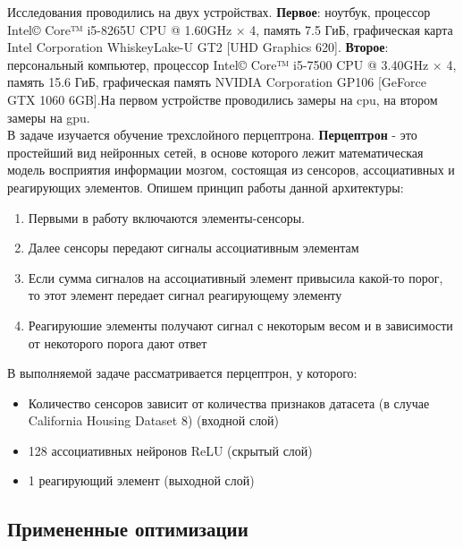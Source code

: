 \documentclass[a4paper,12pt,titlepage,final]{article}
\begin{document}
Исследования проводились на двух устройствах. \textbf{Первое}: ноутбук, процессор Intel© Core™ i5-8265U CPU @ 1.60GHz × 4, память 7.5 ГиБ, графическая карта Intel Corporation WhiskeyLake-U GT2 [UHD Graphics 620]. \textbf{Второе}: персональный компьютер, процессор Intel© Core™ i5-7500 CPU @ 3.40GHz × 4, память 15.6 ГиБ, графическая память NVIDIA Corporation GP106 [GeForce GTX 1060 6GB].На первом устройстве проводились замеры на cpu, на втором замеры на gpu.\\

В задаче изучается обучение трехслойного перцептрона. \textbf{Перцептрон} - это простейший вид нейронных сетей, в основе которого лежит математическая модель восприятия информации мозгом, состоящая из сенсоров, ассоциативных и реагирующих элементов. Опишем принцип работы данной архитектуры:
\begin{enumerate}
    \item Первыми в работу включаются элементы-сенсоры.
    \item Далее сенсоры передают сигналы ассоциативным элементам
    \item Если сумма сигналов на ассоциативный элемент привысила какой-то порог, то этот элемент передает сигнал реагирующему элементу
    \item Реагируюшие элементы получают сигнал с некоторым весом и в зависимости от некоторого порога дают ответ
\end{enumerate}

В выполняемой задаче рассматривается перцептрон, у которого:
\begin{itemize}
    \item Количество сенсоров зависит от количества признаков датасета (в случае California Housing Dataset 8) (входной слой)
    \item 128 ассоциативных нейронов ReLU (скрытый слой)
    \item 1 реагирующий элемент (выходной слой)
\end{itemize}

\begin{center}
    \item \subsection{Примененные оптимизации}
\end{center}
\end{document}
